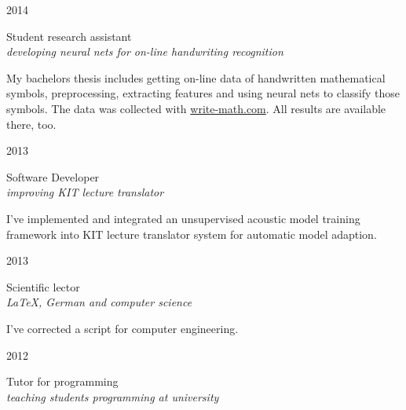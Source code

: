 \documentclass[a4paper,10pt]{article} %
\begin{document}
{\begin{minipage}[t]{0.5\textwidth}

{\raggedleft\textsc{2014}\par}

{\raggedright\large Student research assistant\\
\textit{developing neural nets for on-line handwriting recognition}\\[5pt]}

\normalsize{My bachelors thesis includes getting on-line data of handwritten
mathematical symbols, preprocessing, extracting features and using neural nets
to classify those symbols. The data was collected with \href{http://write-math.com}{write-math.com}. All results are available there, too.}\\


{\raggedleft\textsc{2013}\par}

{\raggedright\large Software Developer\\
\textit{improving KIT lecture translator}\\[5pt]}

\normalsize{I've implemented and integrated an unsupervised acoustic model training framework into KIT lecture translator system for automatic model adaption.}\\


{\raggedleft\textsc{2013}\par}

{\raggedright\large Scientific lector\\
\textit{\LaTeX{}, German and computer science}\\[5pt]}

\normalsize{I've corrected a script for computer engineering.}\\


{\raggedleft\textsc{2012}\par}

{\raggedright\large Tutor for programming\\
\textit{teaching students programming at university}\\[5pt]}


\end{minipage}}
\end{document}
